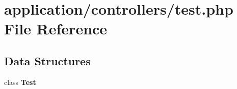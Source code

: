 \section{application/controllers/test.php File Reference}
\label{test_8php}
\subsection*{Data Structures}
\begin{DoxyCompactItemize}
\item 
class {\bf Test}
\end{DoxyCompactItemize}
